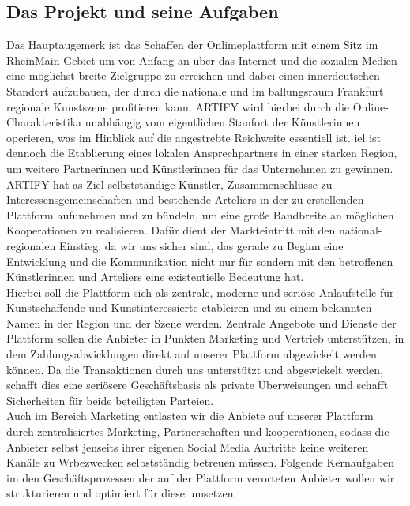 \documentclass[11pt,a4paper]{report}
\begin{document}
\subsection{Das Projekt und seine Aufgaben}
Das Hauptaugemerk ist das Schaffen der Onlimeplattform mit einem Sitz im RheinMain Gebiet um von Anfang an über das Internet und die sozialen Medien eine möglichst breite Zielgruppe zu erreichen und dabei einen innerdeutschen Standort aufzubauen, der durch die nationale und im ballungsraum Frankfurt regionale Kunstszene profitieren kann. ARTIFY wird hierbei durch die Online-Charakteristika unabhängig vom eigentlichen Stanfort der Künstlerinnen operieren, was im Hinblick auf die angestrebte Reichweite essentiell ist. iel ist dennoch die Etablierung eines lokalen Ansprechpartners in einer starken Region, um weitere Partnerinnen und Künstlerinnen für das Unternehmen zu gewinnen.\\
ARTIFY hat as Ziel selbstständige Künstler, Zusammenschlüsse zu Interessensgemeinschaften und bestehende Arteliers in der zu erstellenden Plattform aufunehmen und zu bündeln, um eine große Bandbreite an möglichen Kooperationen zu realisieren. Dafür dient der Markteintritt mit den national-regionalen Einstieg, da wir uns sicher sind, das gerade zu Beginn eine Entwicklung und die Kommunikation nicht nur für sondern mit den betroffenen Künstlerinnen und Arteliers eine existentielle Bedeutung hat. \\
Hierbei soll die Plattform sich als zentrale, moderne und seriöse Anlaufstelle für Kunstschaffende und Kunstinteressierte etableiren und zu einem bekannten Namen in der Region und der Szene werden. Zentrale Angebote und Dienste der Plattform sollen die Anbieter in Punkten Marketing und Vertrieb unterstützen, in dem Zahlungsabwicklungen direkt auf unserer Plattform abgewickelt werden können. Da die Transaktionen durch uns unterstützt und abgewickelt werden, schafft dies eine seriösere Geschäftsbasis als private Überweisungen und schafft Sicherheiten für beide beteiligten Parteien.\\
Auch im Bereich Marketing entlasten wir die Anbiete auf unserer Plattform durch zentralisiertes Marketing, Partnerschaften und kooperationen, sodass die Anbieter selbst jenseits ihrer eigenen Social Media Auftritte keine weiteren Kanäle zu Wrbezwecken selbstständig betreuen müssen.
Folgende Kernaufgaben im den Geschäftsprozessen der auf der Plattform verorteten Anbieter wollen wir strukturieren und optimiert für diese umsetzen:
\end{document}
